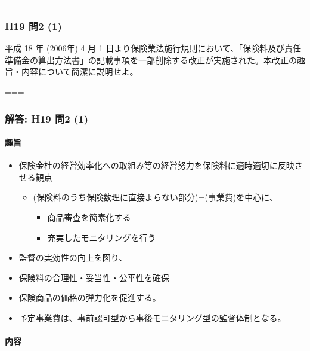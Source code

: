 \documentclass[]{article}
\begin{document}
\begin{center}\rule{0.5\linewidth}{0.5pt}\end{center}

\hypertarget{h19-ux554f2-1}{%
\subsubsection{H19 問2 (1)}\label{h19-ux554f2-1}}

平成 18 年 (2006年) 4 月 1
日より保険業法施行規則において、「保険料及び責任準備金の算出方法書」の記載事項を一部削除する改正が実施された。本改正の趣旨・内容について簡潔に説明せよ。

===

\hypertarget{ux89e3ux7b54-h19-ux554f2-1}{%
\subsubsection{解答: H19 問2 (1)}\label{ux89e3ux7b54-h19-ux554f2-1}}

\hypertarget{ux8da3ux65e8}{%
\paragraph{趣旨}\label{ux8da3ux65e8}}

\begin{itemize}
\tightlist
\item
  保険金杜の経営効率化への取組み等の経営努力を保険料に適時適切に反映させる観点

  \begin{itemize}
  \tightlist
  \item
    (保険料のうち保険数理に直接よらない部分)=(事業費)を中心に、

    \begin{itemize}
    \tightlist
    \item
      商品審査を簡素化する
    \item
      充実したモニタリングを行う
    \end{itemize}
  \end{itemize}
\item
  監督の実効性の向上を図り、
\item
  保険料の合理性・妥当性・公平性を確保
\item
  保険商品の価格の弾力化を促進する。
\item
  予定事業費は、事前認可型から事後モニタリング型の監督体制となる。
\end{itemize}

\hypertarget{ux5185ux5bb9}{%
\paragraph{内容}\label{ux5185ux5bb9}}
\end{document}
